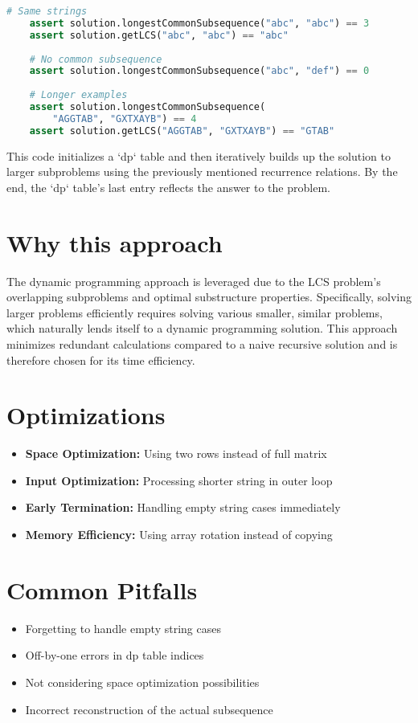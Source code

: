 \begin{fullwidth}
\begin{lstlisting}[language=Python]
    # Same strings
    assert solution.longestCommonSubsequence("abc", "abc") == 3
    assert solution.getLCS("abc", "abc") == "abc"
    
    # No common subsequence
    assert solution.longestCommonSubsequence("abc", "def") == 0
    
    # Longer examples
    assert solution.longestCommonSubsequence(
        "AGGTAB", "GXTXAYB") == 4
    assert solution.getLCS("AGGTAB", "GXTXAYB") == "GTAB"
\end{lstlisting}
\end{fullwidth}

This code initializes a `dp` table and then iteratively builds up the solution to larger subproblems using the previously mentioned recurrence relations. By the end, the `dp` table's last entry reflects the answer to the problem.

\section*{Why this approach}
The dynamic programming approach is leveraged due to the LCS problem's overlapping subproblems and optimal substructure properties. Specifically, solving larger problems efficiently requires solving various smaller, similar problems, which naturally lends itself to a dynamic programming solution. This approach minimizes redundant calculations compared to a naive recursive solution and is therefore chosen for its time efficiency.

\section*{Optimizations}
\begin{itemize}
    \item \textbf{Space Optimization:} Using two rows instead of full matrix
    \item \textbf{Input Optimization:} Processing shorter string in outer loop
    \item \textbf{Early Termination:} Handling empty string cases immediately
    \item \textbf{Memory Efficiency:} Using array rotation instead of copying
\end{itemize}

\section*{Common Pitfalls}
\begin{itemize}
    \item Forgetting to handle empty string cases
    \item Off-by-one errors in dp table indices
    \item Not considering space optimization possibilities
    \item Incorrect reconstruction of the actual subsequence
\end{itemize}

